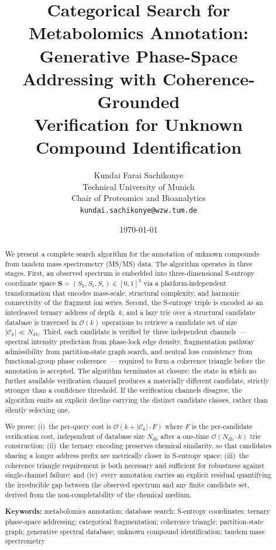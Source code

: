 \documentclass[twocolumn,10pt,a4paper]{article}
\title{\textbf{Categorical Search for Metabolomics Annotation:\\
Generative Phase-Space Addressing with Coherence-Grounded\\
Verification for Unknown Compound Identification}}
\author{
Kundai Farai Sachikonye\\
Technical University of Munich\\
Chair of Proteomics and Bioanalytics\\
\texttt{kundai.sachikonye@wzw.tum.de}
}
\date{\today}
\theoremstyle{thmstyle}
\theoremstyle{definition}
\theoremstyle{remark}
\newcommand{\Sv}{\mathbf{S}}
\newcommand{\Sk}{S_{k}}
\newcommand{\St}{S_{t}}
\newcommand{\Se}{S_{e}}
\newcommand{\calC}{\mathcal{C}}
\begin{document}
\maketitle

\begin{abstract}
\noindent
We present a complete search algorithm for the annotation of unknown
compounds from tandem mass spectrometry (MS/MS) data. The algorithm
operates in three stages. First, an observed spectrum is embedded into
three-dimensional S-entropy coordinate space $\Sv = (\Sk, \St, \Se)
\in [0,1]^3$ via a platform-independent transformation that encodes
mass-scale, structural complexity, and harmonic connectivity of the
fragment ion series. Second, the S-entropy triple is encoded as an
interleaved ternary address of depth~$k$, and a lazy trie over a
structural candidate database is traversed in $\mathcal{O}(k)$
operations to retrieve a candidate set of size
$|\calC_k| \ll N_{\mathrm{db}}$. Third, each candidate is verified
by three independent channels~--- spectral intensity prediction from
phase-lock edge density, fragmentation pathway admissibility from
partition-state graph search, and neutral loss consistency from
functional-group phase coherence~--- required to form a coherence
triangle before the annotation is accepted. The algorithm terminates
at closure: the state in which no further available verification
channel produces a materially different candidate, strictly stronger
than a confidence threshold. If the verification channels disagree,
the algorithm emits an explicit decline carrying the distinct candidate
classes, rather than silently selecting one.

We prove: (i)~the per-query cost is $\mathcal{O}(k + |\calC_k| \cdot
F)$ where $F$ is the per-candidate verification cost, independent of
database size $N_{\mathrm{db}}$ after a one-time $\mathcal{O}(N_{\mathrm{db}}
\cdot k)$ trie construction; (ii)~the ternary encoding preserves
chemical similarity, so that candidates sharing a longer address prefix
are metrically closer in S-entropy space; (iii)~the coherence triangle
requirement is both necessary and sufficient for robustness against
single-channel failure; and (iv)~every annotation carries an explicit
residual quantifying the irreducible gap between the observed spectrum
and any finite candidate set, derived from the non-completability of
the chemical medium.

\bigskip\noindent\textbf{Keywords:}
metabolomics annotation; database search; S-entropy coordinates;
ternary phase-space addressing; categorical fragmentation; coherence
triangle; partition-state graph; generative spectral database;
unknown compound identification; tandem mass spectrometry
\end{abstract}
\end{document}
